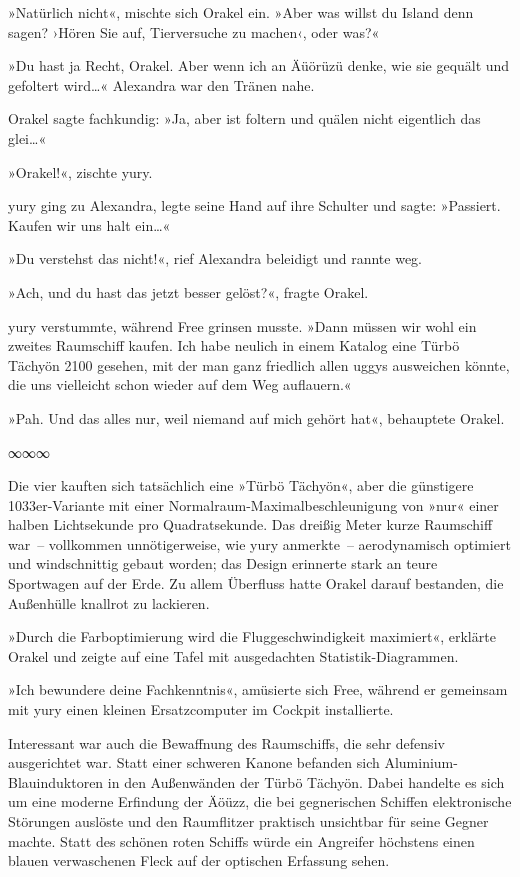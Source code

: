 »Natürlich nicht«, mischte sich Orakel ein. »Aber was willst du Island denn sagen? ›Hören Sie auf, Tierversuche zu machen‹, oder was?«

»Du hast ja Recht, Orakel. Aber wenn ich an Äüörüzü denke, wie sie gequält und gefoltert wird…« Alexandra war den Tränen nahe.

Orakel sagte fachkundig: »Ja, aber ist foltern und quälen nicht eigentlich das glei…«

»Orakel!«, zischte yury.

yury ging zu Alexandra, legte seine Hand auf ihre Schulter und sagte: »Passiert. Kaufen wir uns halt ein…«

»Du verstehst das nicht!«, rief Alexandra beleidigt und rannte weg.

»Ach, und du hast das jetzt besser gelöst?«, fragte Orakel.

yury verstummte, während Free grinsen musste. »Dann müssen wir wohl ein zweites Raumschiff kaufen. Ich habe neulich in einem Katalog eine Türbö Tächyön 2100 gesehen, mit der man ganz friedlich allen uggys ausweichen könnte, die uns vielleicht schon wieder auf dem Weg auflauern.«

»Pah. Und das alles nur, weil niemand auf mich gehört hat«, behauptete Orakel.

\begin{center}
    ∞∞∞
\end{center}

Die vier kauften sich tatsächlich eine »Türbö Tächyön«, aber die günstigere 1033er-Variante mit einer Normalraum-Maximalbeschleunigung von »nur« einer halben Lichtsekunde pro Quadratsekunde. Das dreißig Meter kurze Raumschiff war~– vollkommen unnötigerweise, wie yury anmerkte~– aerodynamisch optimiert und windschnittig gebaut worden; das Design erinnerte stark an teure Sportwagen auf der Erde. Zu allem Überfluss hatte Orakel darauf bestanden, die Außenhülle knallrot zu lackieren.

»Durch die Farboptimierung wird die Fluggeschwindigkeit maximiert«, erklärte Orakel und zeigte auf eine Tafel mit ausgedachten Statistik-Diagrammen.

»Ich bewundere deine Fachkenntnis«, amüsierte sich Free, während er gemeinsam mit yury einen kleinen Ersatzcomputer im Cockpit installierte.

Interessant war auch die Bewaffnung des Raumschiffs, die sehr defensiv ausgerichtet war. Statt einer schweren Kanone befanden sich Aluminium-Blauinduktoren in den Außenwänden der Türbö Tächyön. Dabei handelte es sich um eine moderne Erfindung der Äöüzz, die bei gegnerischen Schiffen elektronische Störungen auslöste und den Raumflitzer praktisch unsichtbar für seine Gegner machte. Statt des schönen roten Schiffs würde ein Angreifer höchstens einen blauen verwaschenen Fleck auf der optischen Erfassung sehen.

